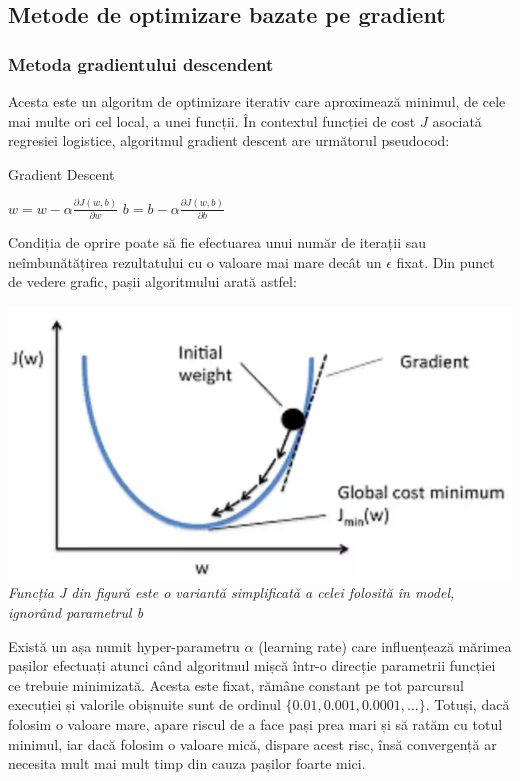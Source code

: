 \subsection{Metode de optimizare bazate pe gradient}
\subsubsection{Metoda gradientului descendent}

Acesta este un algoritm de optimizare iterativ care aproximează minimul, de cele mai multe ori cel local, a unei funcții. În contextul funcției de cost $J$ asociată regresiei logistice, algoritmul gradient descent are următorul pseudocod:

\begin{algorithm}
\caption{Gradient Descent}
\begin{algorithmic}[1]
\State $w = w - \alpha\frac{\partial J(w,b)}{\partial w}$
\State $b = b - \alpha\frac{\partial J(w,b)}{\partial b}$
\EndWhile
\end{algorithmic}
\end{algorithm}

Condiția de oprire poate să fie efectuarea unui număr de iterații sau neîmbunătățirea rezultatului cu o valoare mai mare decât un $\epsilon$ fixat. Din punct de vedere grafic, pașii algoritmului arată astfel:

\begin{center}
\includegraphics[scale=0.5]{gradientDescent} \\
\textit{Funcția J din figură este o variantă simplificată a celei folosită în model, ignorând parametrul b}
\end{center}

Există un așa numit hyper-parametru $\alpha$ (learning rate) care influențează mărimea pașilor efectuați atunci când algoritmul mișcă într-o direcție parametrii funcției ce trebuie minimizată. Acesta este fixat, rămâne constant pe tot parcursul execuției și valorile obișnuite sunt de ordinul $\{0.01, 0.001, 0.0001, ...\}$. Totuși, dacă folosim o valoare mare, apare riscul de a face pași prea mari și să ratăm cu totul minimul, iar dacă folosim o valoare mică, dispare acest risc, însă convergență ar necesita mult mai mult timp din cauza pașilor foarte mici.

